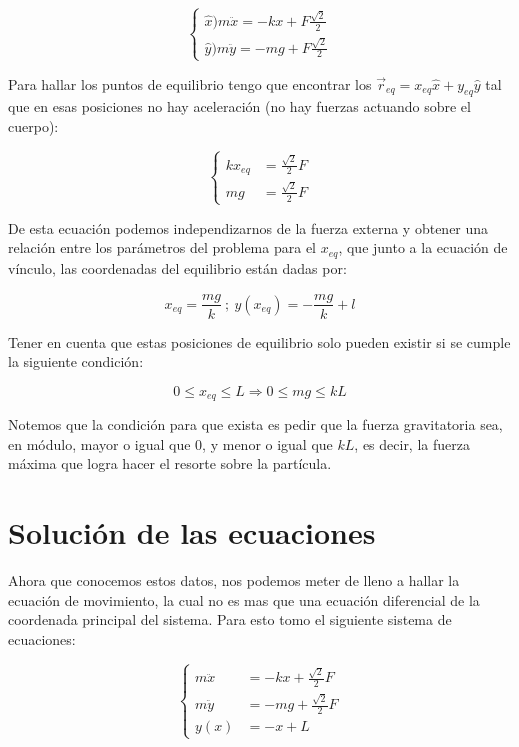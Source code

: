\documentclass{article}
\begin{document}
\begin{multicols}{2}
\begin{equation}
\begin{cases}
    \hat{x}\big) m\ddot{x} = -kx + F\frac{\sqrt{2}}{2} \\
    \hat{y}\big) m\ddot{y} = -mg + F\frac{\sqrt{2}}{2}
\end{cases}
\end{equation}

Para hallar los puntos de equilibrio tengo que encontrar los $\vec{r}_{eq} = x_{eq} \hat{x} + y_{eq} \hat{y}$ tal que en esas posiciones no hay aceleración (no hay fuerzas actuando sobre el cuerpo):

\begin{equation}
\begin{cases}
    kx_{eq} &= \frac{\sqrt{2}}{2}F \\
    mg &= \frac{\sqrt{2}}{2}F
\end{cases}
\end{equation}

De esta ecuación podemos independizarnos de la fuerza externa y obtener una relación entre los parámetros del problema para el $x_{eq}$, que junto a la ecuación de vínculo, las coordenadas del equilibrio están dadas por:

\begin{equation}
    x_{eq} = \frac{mg}{k} \ ; \ y(x_{eq}) = -\frac{mg}{k} + l
\end{equation}

Tener en cuenta que estas posiciones de equilibrio solo pueden existir si se cumple la siguiente condición:

\begin{equation}
    0 \leq x_{eq} \leq L \Rightarrow 0 \leq mg \leq kL
\end{equation}

Notemos que la condición para que exista es pedir que la fuerza gravitatoria sea, en módulo, mayor o igual que $0$, y menor o igual que $kL$, es decir, la fuerza máxima que logra hacer el resorte sobre la partícula.

\section{Solución de las ecuaciones}
Ahora que conocemos estos datos, nos podemos meter de lleno a hallar la ecuación de movimiento, la cual no es mas que una ecuación diferencial de la coordenada principal del sistema. Para esto tomo el siguiente sistema de ecuaciones:

\begin{equation}
\begin{cases}
    m\ddot{x} &= -kx + \frac{\sqrt{2}}{2}F \\
    m\ddot{y} &= -mg + \frac{\sqrt{2}}{2}F \\
    y(x) &= -x + L
\end{cases}
\end{equation}


\end{multicols}
\end{document}
